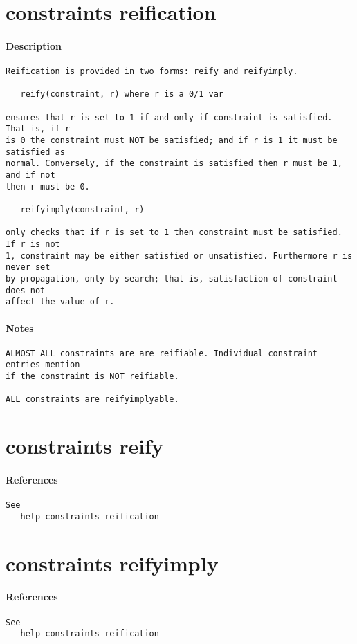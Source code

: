 \section{constraints reification}
\paragraph{Description}
{\footnotesize
\begin{verbatim}
Reification is provided in two forms: reify and reifyimply.

   reify(constraint, r) where r is a 0/1 var

ensures that r is set to 1 if and only if constraint is satisfied. That is, if r
is 0 the constraint must NOT be satisfied; and if r is 1 it must be satisfied as
normal. Conversely, if the constraint is satisfied then r must be 1, and if not
then r must be 0.

   reifyimply(constraint, r)

only checks that if r is set to 1 then constraint must be satisfied. If r is not
1, constraint may be either satisfied or unsatisfied. Furthermore r is never set
by propagation, only by search; that is, satisfaction of constraint does not
affect the value of r.
\end{verbatim}
}
\paragraph{Notes}
{\footnotesize
\begin{verbatim}
ALMOST ALL constraints are are reifiable. Individual constraint entries mention
if the constraint is NOT reifiable.

ALL constraints are reifyimplyable.
\end{verbatim}
}
\section{constraints reify}
\paragraph{References}
{\footnotesize
\begin{verbatim}
See
   help constraints reification
\end{verbatim}
}
\section{constraints reifyimply}
\paragraph{References}
{\footnotesize
\begin{verbatim}
See
   help constraints reification
\end{verbatim}
}
